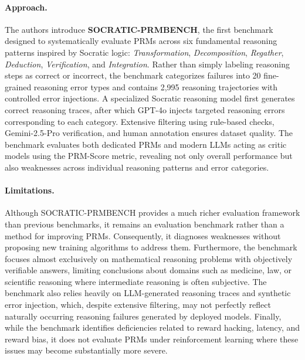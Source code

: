 \documentclass[11pt]{article}
\begin{document}
\paragraph{Approach.}
The authors introduce \textbf{SOCRATIC-PRMBENCH}, the first benchmark designed to systematically evaluate PRMs across six fundamental reasoning patterns inspired by Socratic logic: \emph{Transformation}, \emph{Decomposition}, \emph{Regather}, \emph{Deduction}, \emph{Verification}, and \emph{Integration}. Rather than simply labeling reasoning steps as correct or incorrect, the benchmark categorizes failures into 20 fine-grained reasoning error types and contains 2,995 reasoning trajectories with controlled error injections. A specialized Socratic reasoning model first generates correct reasoning traces, after which GPT-4o injects targeted reasoning errors corresponding to each category. Extensive filtering using rule-based checks, Gemini-2.5-Pro verification, and human annotation ensures dataset quality. The benchmark evaluates both dedicated PRMs and modern LLMs acting as critic models using the PRM-Score metric, revealing not only overall performance but also weaknesses across individual reasoning patterns and error categories.  

\paragraph{Limitations.}
Although SOCRATIC-PRMBENCH provides a much richer evaluation framework than previous benchmarks, it remains an evaluation benchmark rather than a method for improving PRMs. Consequently, it diagnoses weaknesses without proposing new training algorithms to address them. Furthermore, the benchmark focuses almost exclusively on mathematical reasoning problems with objectively verifiable answers, limiting conclusions about domains such as medicine, law, or scientific reasoning where intermediate reasoning is often subjective. The benchmark also relies heavily on LLM-generated reasoning traces and synthetic error injection, which, despite extensive filtering, may not perfectly reflect naturally occurring reasoning failures generated by deployed models. Finally, while the benchmark identifies deficiencies related to reward hacking, latency, and reward bias, it does not evaluate PRMs under reinforcement learning where these issues may become substantially more severe.  
\end{document}
